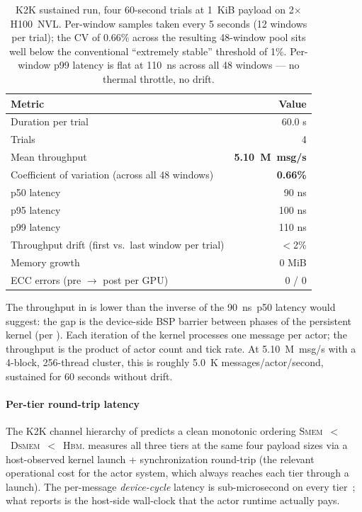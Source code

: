 \begin{table}[htbp]
\centering
\begin{tabular}{lr}
\toprule
Metric & Value \\
\midrule
Duration per trial & 60.0 s \\
Trials & 4 \\
Mean throughput & \textbf{5.10~M~msg/s} \\
Coefficient of variation (across all 48 windows) & \textbf{0.66\%} \\
p50 latency & 90 ns \\
p95 latency & 100 ns \\
p99 latency & 110 ns \\
Throughput drift (first vs.\ last window per trial) & $<$2\% \\
Memory growth & 0 MiB \\
ECC errors (pre $\to$ post per GPU) & 0 / 0 \\
\bottomrule
\end{tabular}
\caption{K2K sustained run, four 60-second trials at 1~KiB payload
on 2$\times$ H100~NVL.  Per-window samples taken every 5 seconds (12
windows per trial); the CV of 0.66\% across the resulting
48-window pool sits well below the conventional ``extremely
stable'' threshold of 1\%.  Per-window p99 latency is flat at
110~ns across all 48 windows — no thermal throttle, no drift.}
\label{tab:k2k-sustained}
\end{table}

The throughput in  is lower than the
inverse of the 90~ns~p50 latency would suggest: the gap is the
device-side BSP barrier between phases of the persistent kernel
(per ).  Each iteration of the
kernel processes one message per actor; the throughput is the
product of actor count and tick rate.  At 5.10~M~msg/s with a
4-block, 256-thread cluster, this is roughly 5.0~K
messages/actor/second, sustained for 60 seconds without drift.

\paragraph{Per-tier round-trip latency}
The K2K channel hierarchy of  predicts a
clean monotonic ordering \textsc{Smem}~$<$~\textsc{Dsmem}~$<$~\textsc{Hbm}.
 measures all three tiers at the same four
payload sizes via a host-observed kernel launch + synchronization
round-trip (the relevant operational cost for the actor system,
which always reaches each tier through a launch).  The per-message
\emph{device-cycle} latency is sub-microsecond on every
tier~\citep{nvidia2022hopper}; what
 reports is the host-side wall-clock that the
actor runtime actually pays.

